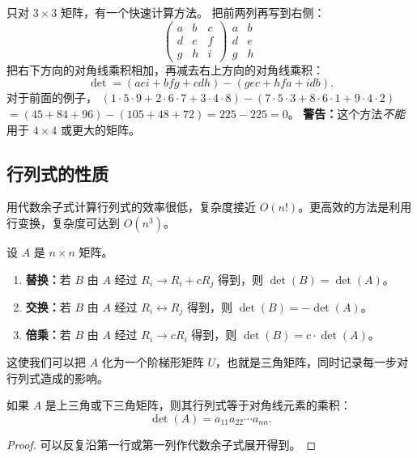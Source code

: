 \begin{remark}
只对 $3\times3$ 矩阵，有一个快速计算方法。
把前两列再写到右侧：
\[
\begin{pmatrix}a&b&c\\d&e&f\\g&h&i\end{pmatrix}
\begin{matrix}a&b\\d&e\\g&h\end{matrix}
\]
把右下方向的对角线乘积相加，再减去右上方向的对角线乘积：
\[ \det=(aei+bfg+cdh)-(gec+hfa+idb). \]
对于前面的例子，
$(1\cdot5\cdot9+2\cdot6\cdot7+3\cdot4\cdot8)-(7\cdot5\cdot3+8\cdot6\cdot1+9\cdot4\cdot2)$
$=(45+84+96)-(105+48+72)=225-225=0$。
\textbf{警告：}这个方法\emph{不能}用于 $4\times4$ 或更大的矩阵。
\end{remark}

\subsection{行列式的性质}
用代数余子式计算行列式的效率很低，复杂度接近 $O(n!)$。更高效的方法是利用行变换，复杂度可达到 $O(n^3)$。

\begin{theorem}[行列式与初等行变换]
设 $A$ 是 $n\times n$ 矩阵。
\begin{enumerate}
    \item \textbf{替换：}若 $B$ 由 $A$ 经过 $R_i\to R_i+cR_j$ 得到，则 $\det(B)=\det(A)$。
    \item \textbf{交换：}若 $B$ 由 $A$ 经过 $R_i\leftrightarrow R_j$ 得到，则 $\det(B)=-\det(A)$。
    \item \textbf{倍乘：}若 $B$ 由 $A$ 经过 $R_i\to cR_i$ 得到，则 $\det(B)=c\cdot\det(A)$。
\end{enumerate}
\end{theorem}

这使我们可以把 $A$ 化为一个阶梯形矩阵 $U$，也就是三角矩阵，同时记录每一步对行列式造成的影响。

\begin{theorem}
如果 $A$ 是上三角或下三角矩阵，则其行列式等于对角线元素的乘积：
\[ \det(A)=a_{11}a_{22}\cdots a_{nn}. \]
\end{theorem}
\begin{proof}
可以反复沿第一行或第一列作代数余子式展开得到。
\end{proof}

